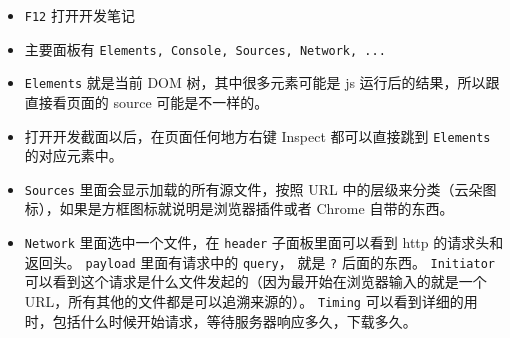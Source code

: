 

\begin{issues}
\issueDraft
\end{issues}

\begin{itemize}
\item \verb`F12` 打开开发笔记
\item 主要面板有 \verb`Elements, Console, Sources, Network, ...`
\item \verb`Elements` 就是当前 DOM 树，其中很多元素可能是 js 运行后的结果，所以跟直接看页面的 source 可能是不一样的。
\item 打开开发截面以后，在页面任何地方右键 Inspect 都可以直接跳到 \verb`Elements` 的对应元素中。
\item \verb`Sources` 里面会显示加载的所有源文件，按照 URL 中的层级来分类（云朵图标），如果是方框图标就说明是浏览器插件或者 Chrome 自带的东西。
\item \verb`Network` 里面选中一个文件，在 \verb`header` 子面板里面可以看到 http 的请求头和返回头。 \verb`payload` 里面有请求中的 \verb`query`， 就是 \verb`?` 后面的东西。 \verb`Initiator` 可以看到这个请求是什么文件发起的（因为最开始在浏览器输入的就是一个 URL，所有其他的文件都是可以追溯来源的）。 \verb`Timing` 可以看到详细的用时，包括什么时候开始请求，等待服务器响应多久，下载多久。
\end{itemize}
